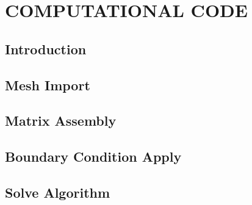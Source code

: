 \chapter{\textbf{COMPUTATIONAL CODE}}
\label{codigo numerico}

\section{\textbf{Introduction}} 


\section{\textbf{Mesh Import}} 
\label{trimesh}


\section{\textbf{Matrix Assembly}} 
\label{trielem}


\section{\textbf{Boundary Condition Apply}} 
\label{tricond}


\section{\textbf{Solve Algorithm}} 
\label{simulador}



